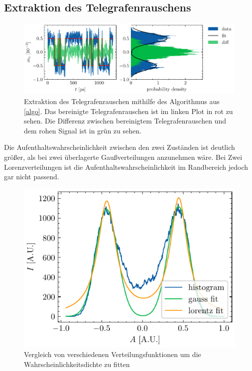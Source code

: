 \documentclass[main.tex]{subfiles}
\begin{document}

\subsection{Extraktion des Telegrafenrauschens}

\begin{figure}[H]
    \centering
    \includegraphics{bilder/plots/Bz_0mT/mc_fit_hist_part2_26.03meV.pdf}
    \caption{Extraktion des Telegrafenrauschen mithilfe des Algorithmus aus \cref{algo}. Das bereinigte Telegrafenrauschen ist im linken Plot in rot zu sehen. Die Differenz zwischen bereinigtem Telegrafenrauschen und dem rohen Signal ist in grün zu sehen.}\label{fig:extraktion-tgr}
\end{figure}

Die Aufenthaltswahrscheinlichkeit zwischen den zwei Zuständen ist deutlich größer, als bei zwei überlagerte Gaußverteilungen anzunehmen wäre. Bei Zwei Lorenzverteilungen ist die Aufenthaltswahrscheinlichkeit im Randbereich jedoch gar nicht passend.

\begin{figure}[H]
    \centering
    \includegraphics{bilder/plots/theo-vis/hist_fit_comp.pdf}
    \caption{Vergleich von verschiedenen Verteilungsfunktionen um die Wahrscheinlichkeitsdichte zu fitten}\label{fig:fit_func_comp}
\end{figure}
\end{document}
